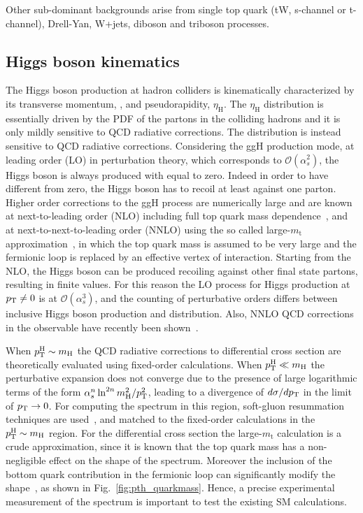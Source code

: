 Other sub-dominant backgrounds arise from single top quark (tW, s-channel or t-channel), Drell-Yan, W+jets, diboson and triboson processes.


\subsection{Higgs boson kinematics}

The Higgs boson production at hadron colliders is kinematically characterized by its transverse momentum, \pth, and pseudorapidity, $\eta_\mathrm{H}$. The $\eta_\mathrm{H}$ distribution is essentially driven by the PDF of the partons in the colliding hadrons and it is only mildly sensitive to QCD radiative corrections. The \pth distribution is instead sensitive to QCD radiative corrections. 
Considering the ggH production mode, at leading order (LO) in perturbation theory, which corresponds to $\mathcal{O}(\alpha_s^2)$, the Higgs boson is always produced with \pth equal to zero. Indeed in order to have \pt different from zero, the Higgs boson has to recoil at least against one parton. Higher order corrections to the ggH process are numerically large and are known at next-to-leading order (NLO) including full top quark mass dependence~\cite{Spira:1995rr,Harlander:2005rq}, and at next-to-next-to-leading order (NNLO) using the so called large-$m_\mathrm{t}$ approximation~\cite{Ravindran:2003um,Catani:2007vq,Anastasiou:2015ema}, in which the top quark mass is assumed to be very large and the fermionic loop is replaced by an effective vertex of interaction. Starting from the NLO, the Higgs boson can be produced recoiling against other final state partons, resulting in finite \pth values. For this reason the LO process for Higgs production at $p_\mathrm{T} \neq 0$ is at $\mathcal{O}(\alpha_s^3)$, and the counting of perturbative orders differs between inclusive Higgs boson production and \pth distribution. Also, NNLO QCD corrections in the \pth observable have recently been shown~\cite{Chen:2016zka}.

When $p_\mathrm{T}^\mathrm{H} \sim m_\mathrm{H}$ the QCD radiative corrections to \pth differential cross section are theoretically evaluated using fixed-order calculations. When $p_\mathrm{T}^\mathrm{H} \ll m_\mathrm{H}$ the perturbative expansion does not converge due to the presence of large logarithmic terms of the form $\alpha_s^n \ln^{2n}m_\mathrm{H}^2/p_\mathrm{T}^2$, leading to a divergence of $d\sigma/dp_\mathrm{T}$ in the limit of $p_\mathrm{T}\to0$. For computing the \pth spectrum in this region, soft-gluon resummation techniques are used~\cite{Bozzi:2005wk,deFlorian:2012mx}, and matched to the fixed-order calculations in the $p_\mathrm{T}^\mathrm{H} \sim m_\mathrm{H}$ region.
For the \pth differential cross section the large-$m_\mathrm{t}$ calculation is a crude approximation, since it is known that the top quark mass has a non-negligible effect on the shape of the spectrum. Moreover the inclusion of the bottom quark contribution in the fermionic loop can significantly modify the \pth shape~\cite{Grazzini:2013mca}, as shown in Fig.~\ref{fig:pth_quarkmass}. Hence, a precise experimental measurement of the \pth spectrum is important to test the existing SM calculations. 

